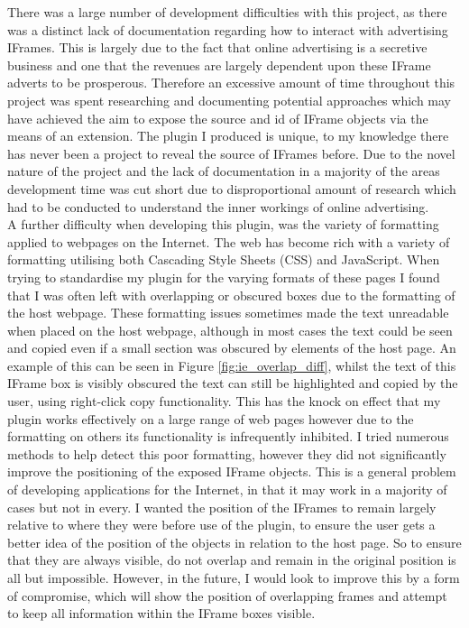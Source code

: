\documentclass[12pt]{article}
\begin{document}
There was a large number of development difficulties with this project, as there was a distinct lack of documentation regarding how to interact with advertising IFrames. This is largely due to the fact that online advertising is a secretive business and one that the revenues are largely dependent upon these IFrame adverts to be prosperous. Therefore an excessive amount of time throughout this project was spent researching and documenting potential approaches which may have achieved the aim to expose the source and id of IFrame objects via the means of an extension. The plugin I produced is unique, to my knowledge there has never been a project to reveal the source of IFrames before. Due to the novel nature of the project and the lack of documentation in a majority of the areas development time was cut short due to disproportional amount of research which had to be conducted to understand the inner workings of online advertising. \\

A further difficulty when developing this plugin, was the variety of formatting applied to webpages on the Internet. The web has become rich with a variety of formatting utilising both Cascading Style Sheets (CSS) and JavaScript. When trying to standardise my plugin for the varying formats of these pages I found that I was often left with overlapping or obscured boxes due to the formatting of the host webpage. These formatting issues sometimes made the text unreadable when placed on the host webpage, although in most cases the text could be seen and copied even if a small section was obscured by elements of the host page. An example of this can be seen in Figure \ref{fig:ie_overlap_diff}, whilst the text of this IFrame box is visibly obscured the text can still be highlighted and copied by the user, using right-click copy functionality. This has the knock on effect that my plugin works effectively on a large range of web pages however due to the formatting on others its functionality is infrequently inhibited. I tried numerous methods to help detect this poor formatting, however they did not significantly improve the positioning of the exposed IFrame objects. This is a general problem of developing applications for the Internet, in that it may work in a majority of cases but not in every. I wanted the position of the IFrames to remain largely relative to where they were before use of the plugin, to ensure the user gets a better idea of the position of the objects in relation to the host page. So to ensure that they are always visible, do not overlap and remain in the original position is all but impossible. However,  in the future, I would look to improve this by a form of compromise, which will show the position of overlapping frames and attempt to keep all information within the IFrame boxes visible. \\
\end{document}
